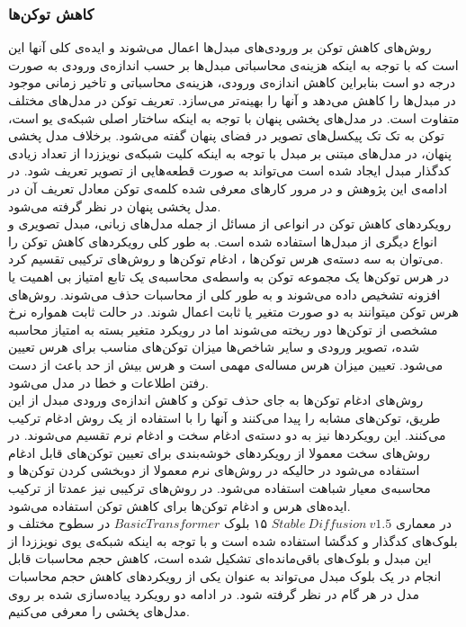 \subsubsection{کاهش توکن‌ها}
روش‌های کاهش توکن بر ورودی‌های مبدل‌ها اعمال می‌شوند و ایده‌ی کلی آنها این است که با توجه به اینکه هزینه‌ی محاسباتی مبدل‌ها بر حسب اندازه‌ی ورودی به صورت درجه دو است بنابراین کاهش اندازه‌ی ورودی، هزینه‌ی محاسباتی و تاخیر زمانی موجود در مبدل‌ها را کاهش می‌دهد و آنها را بهینه‌تر می‌سازد. تعریف توکن در مدل‌های مختلف متفاوت است. در مدل‌های پخشی پنهان با توجه به اینکه ساختار اصلی شبکه‌ی یو است، توکن به تک تک پیکسل‌های تصویر در فضای پنهان گفته می‌شود. برخلاف مدل پخشی پنهان، در مدل‌های مبتنی بر مبدل با توجه به اینکه کلیت شبکه‌ی نویززدا از تعداد زیادی کدگذار مبدل ایجاد شده است می‌تواند به صورت قطعه‌هایی از تصویر تعریف شود. در ادامه‌ی این پژوهش و در مرور کار‌های معرفی شده کلمه‌ی توکن معادل تعریف آن در مدل پخشی پنهان در نظر گرفته می‌شود.
\\
رویکرد‌های کاهش توکن در انواعی از مسائل از جمله مدل‌های زبانی، مبدل تصویری و انواع دیگری از مبدل‌ها استفاده شده است. به طور کلی رویکرد‌های کاهش توکن را می‌توان به سه دسته‌ی هرس توکن‌ها ، ادغام توکن‌ها و روش‌های ترکیبی تقسیم کرد\cite{haurum2023tokens}\cite{kim2024token}. 
\\
در هرس توکن‌ها یک مجموعه توکن به واسطه‌ی محاسبه‌ی یک تابع امتیاز بی اهمیت یا افزونه تشخیص داده می‌شوند و به طور کلی از محاسبات حذف می‌شوند. روش‌های هرس توکن میتوانند به دو صورت متغیر یا ثابت اعمال شوند. در حالت ثابت همواره نرخ مشخصی از توکن‌ها دور ریخته می‌شوند اما در رویکرد متغیر بسته به امتیاز محاسبه شده، تصویر ورودی و سایر شاخص‌ها میزان توکن‌های مناسب برای هرس تعیین می‌شود. تعیین میزان هرس مساله‌ی مهمی است و هرس بیش از حد باعث از دست رفتن اطلاعات و خطا در مدل می‌شود\cite{kim2024token}.
\\
روش‌های ادغام توکن‌ها به جای حذف توکن و کاهش اندازه‌ی ورودی مبدل از این طریق، توکن‌های مشابه را پیدا می‌کنند و آنها را با استفاده از یک روش ادغام ترکیب می‌کنند. این رویکردها نیز به دو دسته‌ی ادغام سخت و ادغام نرم تقسیم می‌شوند. در روش‌های سخت معمولا از رویکردهای خوشه‌بندی برای تعیین توکن‌های قابل ادغام استفاده می‌شود در حالیکه در روش‌های نرم معمولا از دوبخشی کردن توکن‌ها و محاسبه‌ی معیار شباهت استفاده می‌شود\cite{haurum2023tokens}. در روش‌های ترکیبی نیز عمدتا از ترکیب ایده‌های هرس و ادغام توکن‌ها برای کاهش توکن استفاده می‌شود.
\\
 در معماری $Stable\ Diffusion\ v1.5$ ۱۵ بلوک $BasicTransformer$ در سطوح مختلف و بلوک‌های کدگذار و کدگشا استفاده شده است\cite{bolya2023token} و با توجه به اینکه شبکه‌ی یو‌ی نویززدا از این مبدل و بلوک‌های باقی‌مانده‌ای تشکیل شده است، کاهش حجم محاسبات قابل انجام در یک بلوک مبدل می‌تواند به عنوان یکی از رویکرد‌های کاهش حجم محاسبات مدل در هر گام در نظر گرفته شود\cite{rombach2022high}. در ادامه دو رویکرد پیاده‌سازی شده بر روی مدل‌های پخشی را معرفی می‌کنیم.
